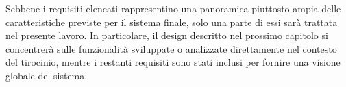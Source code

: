 Sebbene i requisiti elencati rappresentino una panoramica piuttosto ampia delle caratteristiche previste per il sistema finale, solo una parte di essi sarà trattata nel presente lavoro. In particolare, il design descritto nel prossimo capitolo si concentrerà sulle funzionalità sviluppate o analizzate direttamente nel contesto del tirocinio, mentre i restanti requisiti sono stati inclusi per fornire una visione globale del sistema.
